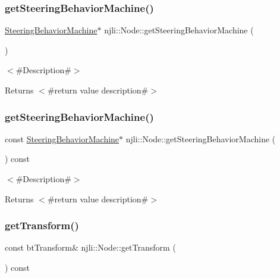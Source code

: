 \subsubsection{\texorpdfstring{get\+Steering\+Behavior\+Machine()}{getSteeringBehaviorMachine()}\hspace{0.1cm}{\footnotesize\ttfamily [1/2]}}
{\footnotesize\ttfamily \mbox{\hyperlink{classnjli_1_1_steering_behavior_machine}{Steering\+Behavior\+Machine}}$\ast$ njli\+::\+Node\+::get\+Steering\+Behavior\+Machine (\begin{DoxyParamCaption}{ }\end{DoxyParamCaption})}

$<$\#\+Description\#$>$

\begin{DoxyReturn}{Returns}
$<$\#return value description\#$>$ 
\end{DoxyReturn}
\mbox{\label{classnjli_1_1_node_ab12edddc98044af4268387ee63ba66d9}} 
\subsubsection{\texorpdfstring{get\+Steering\+Behavior\+Machine()}{getSteeringBehaviorMachine()}\hspace{0.1cm}{\footnotesize\ttfamily [2/2]}}
{\footnotesize\ttfamily const \mbox{\hyperlink{classnjli_1_1_steering_behavior_machine}{Steering\+Behavior\+Machine}}$\ast$ njli\+::\+Node\+::get\+Steering\+Behavior\+Machine (\begin{DoxyParamCaption}{ }\end{DoxyParamCaption}) const}

$<$\#\+Description\#$>$

\begin{DoxyReturn}{Returns}
$<$\#return value description\#$>$ 
\end{DoxyReturn}
\mbox{\label{classnjli_1_1_node_ae54076fc2201492cead884c2dc7407b9}} 
\subsubsection{\texorpdfstring{get\+Transform()}{getTransform()}}
{\footnotesize\ttfamily const bt\+Transform\& njli\+::\+Node\+::get\+Transform (\begin{DoxyParamCaption}{ }\end{DoxyParamCaption}) const}



